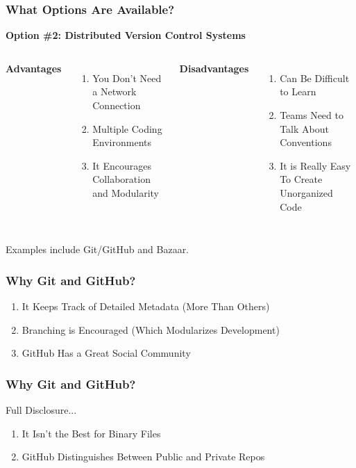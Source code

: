 \begin{frame}
\frametitle{\large{What Options Are Available?}}
\textbf{Option \#2: Distributed Version Control Systems}
\vspace{8mm}
\begin{columns}[c]
\column{2in}
{\small \textbf{Advantages}}
\begin{enumerate}
\small
\item You Don't Need a Network Connection
\item Multiple Coding Environments
\item It Encourages Collaboration and Modularity
\end{enumerate}
\column{2in}
{\small \textbf{Disadvantages}}
\begin{enumerate}
\small
\item Can Be Difficult to Learn
\item Teams Need to Talk About Conventions
\item It is Really Easy To Create Unorganized Code 
\end{enumerate}
\end{columns}
\vspace{5mm}
{\small Examples include Git/GitHub and Bazaar.}
\end{frame}

\begin{frame}
\frametitle{\large{Why Git and GitHub?}}
\begin{enumerate}
\item It Keeps Track of Detailed Metadata (More Than Others)
\item Branching is Encouraged (Which Modularizes Development)
\item GitHub Has a Great Social Community
\end{enumerate}
\end{frame}

\begin{frame}
\frametitle{\large{Why Git and GitHub?}}
Full Disclosure...
\begin{enumerate}
\item It Isn't the Best for Binary Files
\item GitHub Distinguishes Between Public and Private Repos
\end{enumerate}
\end{frame}

